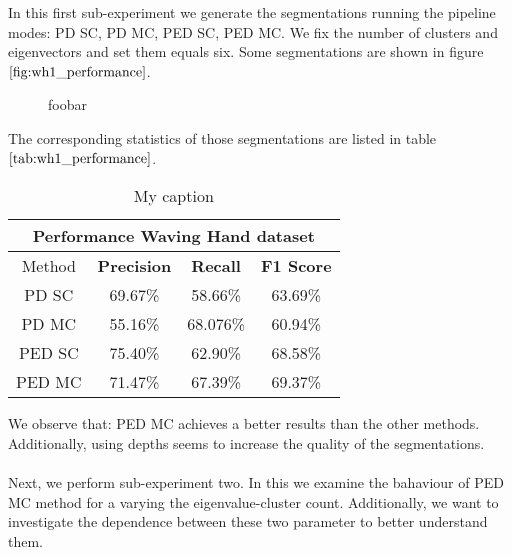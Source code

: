 In this first sub-experiment we generate the segmentations running the pipeline modes: PD SC, PD MC, PED SC, PED MC. We fix the number of clusters and eigenvectors and set them equals six. Some segmentations are shown in figure $\ref{fig:wh1_performance}$.
\begin{figure}[H]
\begin{center}
\end{center}
\caption[Segmentations Waving Hand]{foobar}
\label{fig:wh1_performance}
\end{figure}
The corresponding statistics of those segmentations are listed in table $\ref{tab:wh1_performance}$.
\begin{table}[H]
\centering
\begin{tabular}{|c|c|c|c|}
\hline
\multicolumn{4}{|c|}{Performance Waving Hand dataset}                        \\ \hline
Method & \textbf{Precision} & \textbf{Recall} & \textbf{F1 Score} \\ \hline
PD SC & 69.67\%   & 58.66\%     & 63.69\%  \\ \hline
PD MC & 55.16\%   & 68.076\%     & 60.94\%  \\ \hline
PED SC & 75.40\%   & 62.90\%     & 68.58\%  \\ \hline
PED MC & 71.47\%   & 67.39\%     & 69.37\%  \\ \hline               
\end{tabular}
\caption[Cars Varying $\lambda$]{My caption}
\label{tab:wh1_performance}
\end{table}
We observe that:
PED MC achieves a better results than the other methods.
Additionally, using depths seems to increase the quality of the segmentations. \\ \\
Next, we perform sub-experiment two. In this we examine the bahaviour of PED MC method for a varying the eigenvalue-cluster count. Additionally, we want to investigate the dependence between these two parameter to better understand them. \\ \\
